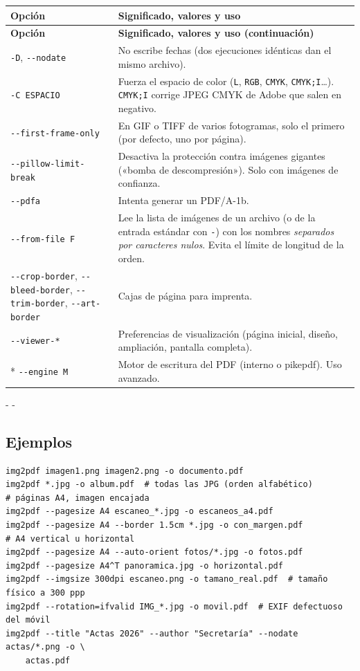 \documentclass[11pt,a4paper]{article}
\makeatletter
\newcommand{\necesitaespacio}[1]{\par\penalty-100\begingroup
	\setlength{\dimen@}{#1}\dimen@ii\pagegoal\advance\dimen@ii-\pagetotal
	\ifdim\dimen@>\dimen@ii\ifdim\dimen@ii>\z@\vfil\fi\penalty-\@M\fi\endgroup}
\newenvironment{opciones}[1][Opción]{%
	\par\begingroup\small
	\begin{longtable}{L{4.25cm}L{11.2cm}}
		\toprule\rowcolor{tablacab}\cab{#1} & \cab{Significado, valores y uso} \\ \midrule
		\endfirsthead
		\toprule\rowcolor{tablacab}\cab{#1} & \cab{Significado, valores y uso (continuación)} \\ \midrule
		\endhead
		\bottomrule
		\endfoot}
	{\end{longtable}\endgroup}
\newcommand{\opt}[1]{\texttt{\textcolor{colopt}{#1}}}      %
\newcommand{\val}[1]{\texttt{#1}}                          %
\newcommand{\cab}[1]{\textbf{#1}}
\makeatother
\begin{document}
\begin{opciones}
		\opt{-D}, \opt{-{}-nodate} & No escribe fechas (dos ejecuciones idénticas dan el mismo archivo).\\
		\opt{-C ESPACIO} & Fuerza el espacio de color (\val{L}, \val{RGB}, \val{CMYK}, \val{CMYK;I}\ldots). \val{CMYK;I} corrige JPEG CMYK de Adobe que salen en negativo.\\
		\opt{-{}-first-\allowbreak{}frame-\allowbreak{}only} & En GIF o TIFF de varios fotogramas, solo el primero (por defecto, uno por página).\\
		\opt{-{}-pillow-\allowbreak{}limit-\allowbreak{}break} & Desactiva la protección contra imágenes gigantes («bomba de descompresión»). Solo con imágenes de confianza.\\
		\opt{-{}-pdfa} & Intenta generar un PDF/A-1b.\\
		\opt{-{}-from-file F} & Lee la lista de imágenes de un archivo (o de la entrada estándar con \val{-}) con los nombres \emph{separados por caracteres nulos}. Evita el límite de longitud de la orden.\\
		\opt{-{}-crop-border}, \opt{-{}-bleed-border}, \opt{-{}-trim-border}, \opt{-{}-art-border} & Cajas de página para imprenta.\\
		\opt{-{}-viewer-*} & Preferencias de visualización (página inicial, diseño, ampliación, pantalla completa).\\*
		\opt{-{}-engine M} & Motor de escritura del PDF (interno o pikepdf). Uso avanzado.\\
	\end{opciones}
	
	\necesitaespacio{8\baselineskip}
	\subsection{Ejemplos}
	
	\begin{lstlisting}
img2pdf imagen1.png imagen2.png -o documento.pdf
img2pdf *.jpg -o album.pdf  # todas las JPG (orden alfabético)
# páginas A4, imagen encajada
img2pdf --pagesize A4 escaneo_*.jpg -o escaneos_a4.pdf
img2pdf --pagesize A4 --border 1.5cm *.jpg -o con_margen.pdf
# A4 vertical u horizontal
img2pdf --pagesize A4 --auto-orient fotos/*.jpg -o fotos.pdf
img2pdf --pagesize A4^T panoramica.jpg -o horizontal.pdf
img2pdf --imgsize 300dpi escaneo.png -o tamano_real.pdf  # tamaño físico a 300 ppp
img2pdf --rotation=ifvalid IMG_*.jpg -o movil.pdf  # EXIF defectuoso del móvil
img2pdf --title "Actas 2026" --author "Secretaría" --nodate actas/*.png -o \
    actas.pdf
\end{lstlisting}
	
\end{document}
